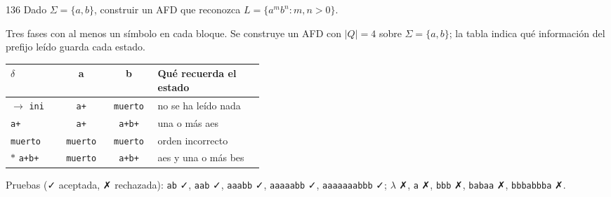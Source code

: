 \documentclass[11pt]{article}
\begin{document}
\begin{ejercicio}{136}{}
Dado $\Sigma = \{a, b\}$, construir un AFD que reconozca $L = \{a^m b^n : m, n > 0\}$.
\end{ejercicio}
\proc Tres fases con al menos un símbolo en cada bloque. Se construye un AFD con $|Q| = 4$ sobre $\Sigma = \{a, b\}$; la tabla indica qué información del prefijo leído guarda cada estado.
\begin{center}\small\begin{tabular}{lccp{0.42\linewidth}}\toprule
$\delta$ & a & b & Qué recuerda el estado \\\midrule
$\to$ \texttt{ini} & \texttt{a+} & \texttt{muerto} & no se ha leído nada \\
 \texttt{a+} & \texttt{a+} & \texttt{a+b+} & una o más aes \\
 \texttt{muerto} & \texttt{muerto} & \texttt{muerto} & orden incorrecto \\
$*$ \texttt{a+b+} & \texttt{muerto} & \texttt{a+b+} & aes y una o más bes \\
\bottomrule\end{tabular}\end{center}
Pruebas (✓ aceptada, ✗ rechazada): \texttt{ab} ✓, \texttt{aab} ✓, \texttt{aaabb} ✓, \texttt{aaaaabb} ✓, \texttt{aaaaaaabbb} ✓; $\lambda$ ✗, \texttt{a} ✗, \texttt{bbb} ✗, \texttt{babaa} ✗, \texttt{bbbabbba} ✗.
\end{document}
